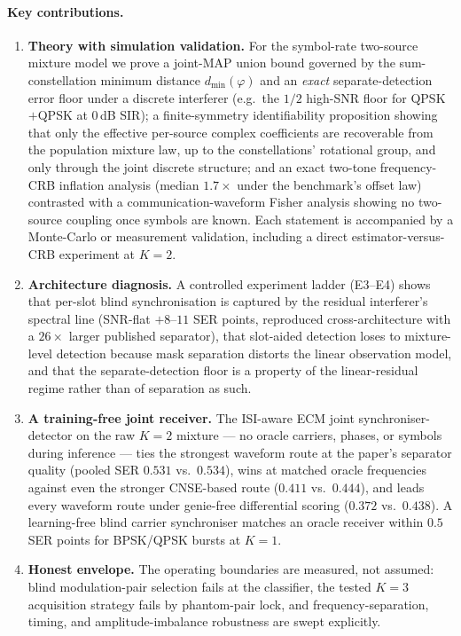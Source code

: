 \documentclass[11pt,a4paper]{article}
\begin{document}
\paragraph{Key contributions.}
\begin{enumerate}
\item \textbf{Theory with simulation validation.} For the symbol-rate
two-source mixture model we prove a joint-MAP union bound governed by the
sum-constellation minimum distance $d_{\min}(\varphi)$ and an \emph{exact}
separate-detection error floor under a discrete interferer (e.g.\ the
$1/2$ high-SNR floor for QPSK$+$QPSK at $0$\,dB SIR); a finite-symmetry
identifiability proposition showing that only the effective per-source
complex coefficients are recoverable from the population mixture law, up
to the constellations' rotational group, and only through the joint
discrete structure; and an exact two-tone frequency-CRB inflation
analysis (median $1.7\times$ under the benchmark's offset law) contrasted
with a communication-waveform Fisher analysis showing no two-source
coupling once symbols are known. Each statement is accompanied by a
Monte-Carlo or measurement validation, including a direct
estimator-versus-CRB experiment at $K{=}2$.
\item \textbf{Architecture diagnosis.} A controlled experiment ladder
(E3--E4) shows that per-slot blind synchronisation is captured by the
residual interferer's spectral line (SNR-flat $+8$--$11$ SER points,
reproduced cross-architecture with a $26\times$ larger published
separator), that slot-aided detection loses to mixture-level detection
because mask separation distorts the linear observation model, and that
the separate-detection floor is a property of the linear-residual regime
rather than of separation as such.
\item \textbf{A training-free joint receiver.} The ISI-aware ECM joint
synchroniser-detector on the raw $K{=}2$ mixture --- no oracle carriers,
phases, or symbols during inference --- ties the strongest waveform route
at the paper's separator quality (pooled SER $0.531$ vs.\ $0.534$), wins
at matched oracle frequencies against even the stronger CNSE-based route
($0.411$ vs.\ $0.444$), and leads every waveform route under genie-free
differential scoring ($0.372$ vs.\ $0.438$). A learning-free blind
carrier synchroniser matches an oracle receiver within $0.5$ SER points
for BPSK/QPSK bursts at $K{=}1$.
\item \textbf{Honest envelope.} The operating boundaries are measured,
not assumed: blind modulation-pair selection fails at the classifier, the
tested $K{=}3$ acquisition strategy fails by phantom-pair lock, and
frequency-separation, timing, and amplitude-imbalance robustness are
swept explicitly.
\end{enumerate}
\end{document}

